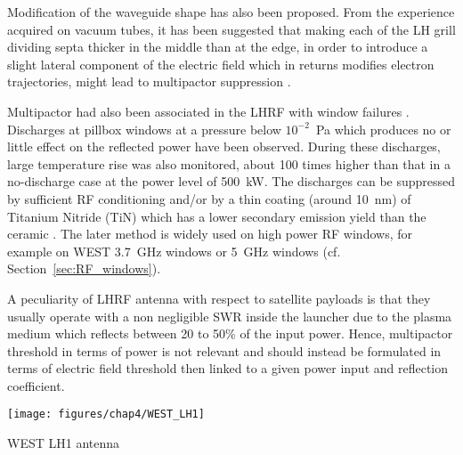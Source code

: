 Modification of the waveguide shape has also been proposed. From the experience acquired on vacuum tubes, it has been suggested that making each of the LH grill dividing septa thicker in the middle than at the edge, in order to introduce a slight lateral component of the electric field which in returns modifies electron trajectories, might lead to multipactor suppression .

Multipactor had also been associated in the LHRF with window failures . Discharges at pillbox windows at a pressure below $10^{-2}$~Pa which produces no or little effect on the reflected power have been observed. During these discharges, large temperature rise was also monitored, about 100 times higher than that in a no-discharge case at the power level of 500~kW. The discharges can be suppressed by sufficient RF conditioning and/or by a thin coating (around 10~nm) of Titanium Nitride (TiN) which has a lower secondary emission yield than the ceramic . The later method is widely used on high power RF windows, for example on WEST 3.7~GHz windows  or 5~GHz windows  (cf. Section~\ref{sec:RF_windows}).


A peculiarity of LHRF antenna with respect to satellite payloads is that they usually operate with a non negligible SWR inside the launcher due to the plasma medium which reflects between 20 to 50\% of the input power. Hence, multipactor threshold in terms of power is not relevant and should instead be formulated in terms of electric field threshold then linked to a given power input and reflection coefficient. 

\begin{marginfigure}[-1cm]
	\centering
	\texttt{[image: figures/chap4/WEST\_LH1]}
	\caption{WEST LH1 antenna}
	\label{fig:westlh1}
\end{marginfigure}

